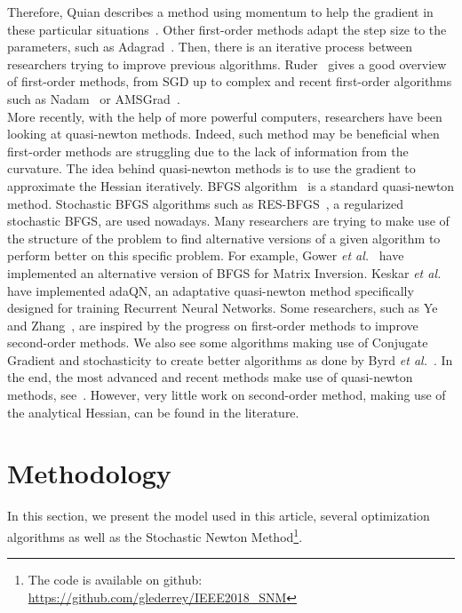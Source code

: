 \documentclass[conference]{IEEEtran}
\begin{document}
Therefore, Quian describes a method using momentum to help the gradient in these particular situations~\cite{qian_momentum_1999}. Other first-order methods adapt the step size to the parameters, such as Adagrad~\cite{duchi_adaptive_2011}. Then, there is an iterative process between researchers trying to improve previous algorithms. Ruder~\cite{ruder_overview_2016} gives a good overview of first-order methods, from SGD up to complex and recent first-order algorithms such as Nadam~\cite{dozat_incorporating_2016} or AMSGrad~\cite{reddi_convergence_2018}. \\

More recently, with the help of more powerful computers, researchers have been looking at quasi-newton methods. Indeed, such method may be beneficial when first-order methods are struggling due to the lack of information from the curvature. The idea behind quasi-newton methods is to use the gradient to approximate the Hessian iteratively. BFGS algorithm~\cite{fletcher_practical_1987} is a standard quasi-newton method. Stochastic BFGS algorithms such as RES-BFGS~\cite{mokhtari_res:_2014}, a regularized stochastic BFGS, are used nowadays. Many researchers are trying to make use of the structure of the problem to find alternative versions of a given algorithm to perform better on this specific problem. For example, Gower {\it et al.}~\cite{gower_accelerated_2018} have implemented an alternative version of BFGS for Matrix Inversion. Keskar {\it et al.}~\cite{keskar_adaqn:_2016} have implemented adaQN, an adaptative quasi-newton method specifically designed for training Recurrent Neural Networks. Some researchers, such as Ye and Zhang~\cite{ye_nestrovs_2017}, are inspired by the progress on first-order methods to improve second-order methods. We also see some algorithms making use of Conjugate Gradient and stochasticity to create better algorithms as done by Byrd {\it et al.}~\cite{byrd_use_2011}. In the end, the most advanced and recent methods make use of quasi-newton methods, see~\cite{kiros_training_2013,bordes_sgd-qn:_2009,bordes_erratum:_2010,agarwal_second-order_2016}. However, very little work on second-order method, making use of the analytical Hessian, can be found in the literature.

\vspace{-0.2cm}
\section{Methodology}
\label{sec:methodo}

In this section, we present the model used in this article, several optimization algorithms as well as the Stochastic Newton Method\footnote{The code is available on github: \href{https://github.com/glederrey/IEEE2018\_SNM}{https://github.com/glederrey/IEEE2018\_SNM}}.
\end{document}
